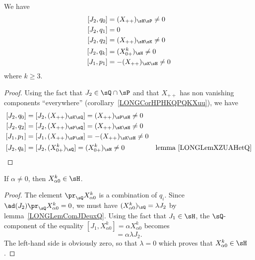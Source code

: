 \begin{lemma}		\label{LONGLemComJDeuxQ}
	We have
	\begin{equation}
		\begin{aligned}[]
			[J_2,q_0] & =(X_{++})_{\sH\sP}\neq 0  \\
			[J_2,q_1] & =0                        \\
			[J_2,q_2] & =(X_{++})_{\sH\sK}\neq 0  \\
			[J_2,q_k] & =(X^k_{0+})_{\sH}\neq 0   \\
			[J_1,p_1] & =-(X_{++})_{\sK\sH}\neq 0
		\end{aligned}
	\end{equation}
	where $k\geq 3$.
\end{lemma}

\begin{proof}
	Using the fact that $J_2\in\sQ\cap\sP$ and that $X_{++}$ has non vanishing components ``everywhere'' (corollary~\ref{LONGCorHPHKQPQKXuu}), we have
	\begin{equation}
		\begin{aligned}[]
			[J_2,q_0] & =[J_2,(X_{++})_{\sK\sQ}]=(X_{++})_{\sP\sH}\neq 0                                       \\
			[J_2,q_2] & =[J_2,(X_{++})_{\sP\sQ}]=(X_{++})_{\sK\sH}\neq 0                                       \\
			[J_1,p_1] & =[J_1,(X_{++})_{\sP\sH}]=-(X_{++})_{\sK\sH}\neq 0                                      \\
			[J_2,q_k] & =[J_2,(X_{0+}^k)_{\sQ}]=(X^k_{0+})_{\sH}\neq 0    & \text{lemma~\ref{LONGLemXZUAHetQ}} \\
		\end{aligned}
	\end{equation}
\end{proof}

\begin{lemma}		\label{LONGLemNonHXaz}
	If $\alpha\neq 0$, then $X_{\alpha 0}^k\in\sH$.
\end{lemma}

\begin{proof}
	The element $\pr_{\sQ}X^k_{\alpha 0}$ is a combination of $q_i$. Since $\ad(J_2)\pr_{\sQ}X^k_{\alpha 0}=0$, we must have $(X^k_{\alpha 0})_{\sQ}=\lambda J_2$ by lemma~\ref{LONGLemComJDeuxQ}. Using the fact that $J_1\in\sH$, the $\sQ$-component of the equality $[J_1,X^k_{\alpha 0}]=\alpha X^k_{\alpha 0}$ becomes
	\begin{equation}
		[J_1,\lambda J_2]=\alpha\lambda J_2.
	\end{equation}
	The left-hand side is obviously zero, so that $\lambda=0$ which proves that $X^k_{\alpha 0}\in\sH$.
\end{proof}

